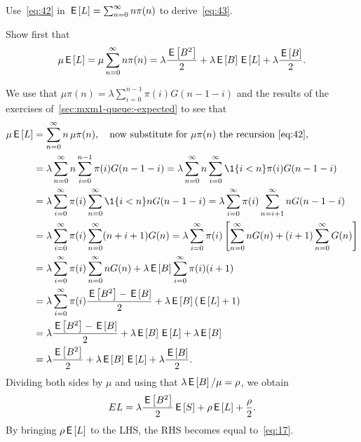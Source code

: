 \documentclass[queueing-book.tex]{subfiles}
\begin{document}
\begin{exercise}\label{ex:73}
Use~\cref{eq:42}
in $\,\mathsf{E}\left[L\right] = \sum_{n=0}^\infty n \pi(n)$ to derive~\cref{eq:43}.
\begin{hint}
  Show first that
\begin{equation*}
 \mu \,\mathsf{E}\left[L\right] =\mu \sum_{n=0}^\infty n \pi(n) = \lambda \frac{\,\mathsf{E}\left[B^2\right]}2 + \lambda \,\mathsf{E}\left[B\right] \,\mathsf{E}\left[L\right] +\lambda \frac{\,\mathsf{E}\left[B\right]}2.
\end{equation*}
\end{hint}
\begin{solution}
 We use that $\mu \pi(n) =\lambda \sum_{i=0}^{n-1} \pi(i) G(n-1-i)$ and the results of the exercises of~\cref{sec:mxm1-queue:-expected} to see that
\begin{align*}
 \mu \E \L
 &=\sum_{n=0}^\infty n\, \mu \pi(n), \quad \text{now substitute for $\mu \pi(n)$ the recursion~\cref{eq:42}}, \\
& =\lambda \sum_{n=0}^\infty n \sum_{i=0}^{n-1} \pi(i) G(n-1-i)
 =\lambda \sum_{n=0}^\infty n \sum_{i=0}^\infty \1{i<n} \pi(i) G(n-1-i) \\
& =\lambda \sum_{i=0}^\infty \pi(i) \sum_{n=0}^\infty \1{i<n} n G(n-1-i)
 =\lambda \sum_{i=0}^\infty \pi(i) \sum_{n=i+1}^\infty n G(n-1-i) \\
& =\lambda \sum_{i=0}^\infty \pi(i) \sum_{n=0}^\infty (n+i+1) G(n)
 =\lambda \sum_{i=0}^\infty \pi(i) \left[\sum_{n=0}^\infty n G(n) +(i+1) \sum_{n=0}^\infty G(n)\right] \\
 &=\lambda \sum_{i=0}^\infty \pi(i)\sum_{n=0}^\infty n G(n) +\lambda \E B \sum_{i=0}^\infty \pi(i) (i+1) \\
 &=\lambda \sum_{i=0}^\infty \pi(i) \frac{\E{B^2} -\E B}2 + \lambda \E B (\E \L +1) \\
 &= \lambda \frac{\E{B^2} -\E B}2 + \lambda \E B \E \L +\lambda \E B \\
 &= \lambda \frac{\E{B^2} }2 + \lambda \E B \E \L +\lambda \frac{\E B}2.
\end{align*}
Dividing both sides by $\mu$ and using that $\lambda \,\mathsf{E}\left[B\right]/\mu = \rho$, we obtain
\begin{equation*}
E L = \lambda \frac{\,\mathsf{E}\left[B^2\right]}2 \,\mathsf{E}\left[S\right] + \rho \,\mathsf{E}\left[L\right] + \frac\rho2.
\end{equation*}
By bringing $\rho \,\mathsf{E}\left[L\right]$ to the LHS, the RHS becomes equal to~\cref{eq:17}.
\end{solution}
\end{exercise}


\end{document}
